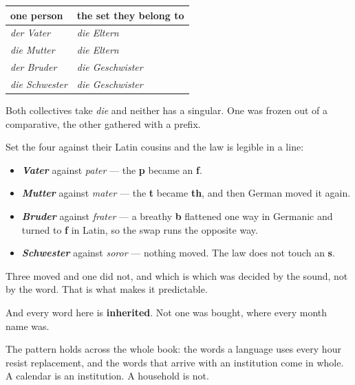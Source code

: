 \begin{grammarlens}[title={Grammar Lens: the four, and their two collectives}]
\noindent
\begin{tabularx}{\linewidth}{@{}>{\raggedright\arraybackslash}X>{\raggedright\arraybackslash}X@{}}
\toprule
\textbf{one person} & \textbf{the set they belong to} \\
\midrule
\emph{der Vater} & \emph{die Eltern} \\
\emph{die Mutter} & \emph{die Eltern} \\
\emph{der Bruder} & \emph{die Geschwister} \\
\emph{die Schwester} & \emph{die Geschwister} \\
\bottomrule
\end{tabularx}

Both collectives take \emph{die} and neither has a singular. One was frozen out of a comparative, the other gathered with a prefix.
\end{grammarlens}

\begin{culture}
Set the four against their Latin cousins and the law is legible in a line:

\begin{itemize}
\raggedright
  \item \emph{\textbf{Vater}} against \emph{pater} — the \textbf{p} became an \textbf{f}.
  \item \emph{\textbf{Mutter}} against \emph{mater} — the \textbf{t} became \textbf{th}, and then German moved it again.
  \item \emph{\textbf{Bruder}} against \emph{frater} — a breathy \textbf{b} flattened one way in Germanic and turned to \textbf{f} in Latin, so the swap runs the opposite way.
  \item \emph{\textbf{Schwester}} against \emph{soror} — nothing moved. The law does not touch an \textbf{s}.
\end{itemize}

Three moved and one did not, and which is which was decided by the sound, not by the word. That is what makes it predictable.
\end{culture}

\begin{culture}
And every word here is \textbf{inherited}. Not one was bought, where every month name was.

The pattern holds across the whole book: the words a language uses every hour resist replacement, and the words that arrive with an institution come in whole. A calendar is an institution. A household is not.
\end{culture}

